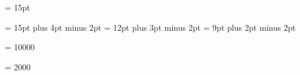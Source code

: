 
\newdimen{} {} = 15pt

\chapheadingskip = 15pt plus 4pt minus 2pt
\secheadingskip = 12pt plus 3pt minus 2pt
\subsecheadingskip = 9pt plus 2pt minus 2pt

\vbadness = 10000

\hbadness = 2000


%
\def\setemergencystretch{%
  \ifx\emergencystretch\thisisundefined
    \def\emergencystretch{\dimen0}%
  \else
    \emergencystretch = .15\hsize
  \fi
}

%
%
\def\internalpagesizes#1#2#3#4#5#6#7#8{%
  \voffset = #3\relax
  \topskip = #6\relax
  \splittopskip = \topskip
  \vsize = #1\relax
  \advance\vsize by \topskip
  \outervsize = \vsize
  \advance\outervsize by 2\topandbottommargin
  \pageheight = \vsize
  \hsize = #2\relax
  \outerhsize = \hsize
  \advance\outerhsize by 0.5in
  \pagewidth = \hsize
  \normaloffset = #4\relax
  \bindingoffset = #5\relax
  \ifpdf
    \pdfpageheight #7\relax
    \pdfpagewidth #8\relax
    \pdfhorigin = 1 true in
    \pdfvorigin = 1 true in
  \fi
  \setleading{\textleading}
  \parindent = \defaultparindent
  \setemergencystretch
}

\def\letterpaper{{\globaldefs = 1
  \parskip = 3pt plus 2pt minus 1pt
  \textleading = 13.2pt
  \internalpagesizes{607.2pt}{6in}%
                    {\voffset}{.25in}%
                    {\bindingoffset}{36pt}%
                    {11in}{8.5in}%
}}

